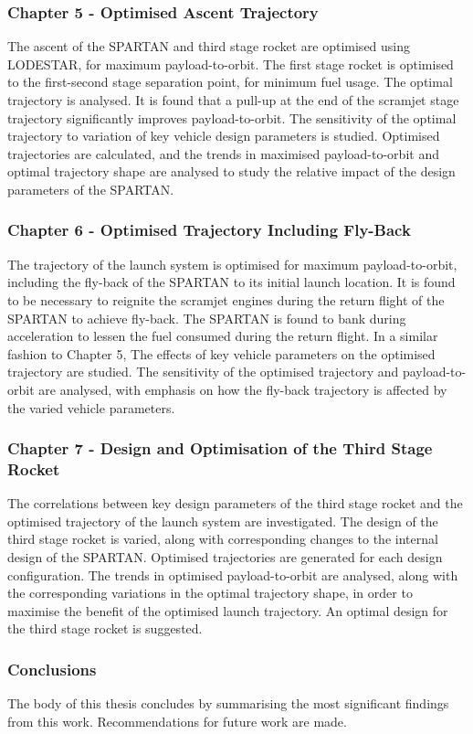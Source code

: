       \subsubsection*{Chapter 5 - Optimised Ascent Trajectory}
      

 The ascent of the SPARTAN and third stage rocket are optimised using LODESTAR, for maximum payload-to-orbit. The first stage rocket is optimised to the first-second stage separation point, for minimum fuel usage. The optimal trajectory is analysed. It is found that a pull-up at the end of the scramjet stage trajectory significantly improves payload-to-orbit.  
 The sensitivity of the optimal trajectory to variation of key vehicle design parameters is studied. Optimised trajectories are calculated, and the trends in maximised payload-to-orbit and optimal trajectory shape are analysed to study the relative impact of the design parameters of the SPARTAN. 
 
 
      
      \subsubsection*{Chapter 6 - Optimised Trajectory Including Fly-Back}
      
      The trajectory of the launch system is optimised for maximum payload-to-orbit, including the fly-back of the SPARTAN to its initial launch location. 
      It is found to be necessary to reignite the scramjet engines during the return flight of the SPARTAN to achieve fly-back.
      The SPARTAN is found to bank during acceleration to lessen the fuel consumed during the return flight.
      In a similar fashion to Chapter 5, The effects of key vehicle parameters on the optimised trajectory are studied. The sensitivity of the optimised trajectory and payload-to-orbit are analysed, with emphasis on how the fly-back trajectory is affected by the varied vehicle parameters.
      
      \subsubsection*{Chapter 7 - Design and Optimisation of the Third Stage Rocket}
      
      The correlations between key design parameters of the third stage rocket and the optimised trajectory of the launch system are investigated. The design of the third stage rocket is varied, along with corresponding changes to the internal design of the SPARTAN. Optimised trajectories are generated for each design configuration. The trends in optimised payload-to-orbit are analysed, along with the corresponding variations in the optimal trajectory shape, in order to maximise the benefit of the optimised launch trajectory. An optimal design for the third stage rocket is suggested.  
      
      
     
      

    \subsubsection*{Conclusions}

      The body of this thesis concludes by summarising the most significant findings from this work. Recommendations for future work are made. 